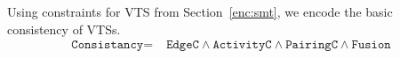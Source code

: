Using constraints for VTS from Section~\ref{enc:smt}, we encode the basic consistency of VTSs. 
%
\begin{align*}
\texttt{Consistancy} =\;& \texttt{EdgeC} \land
\texttt{ActivityC} \land \texttt{PairingC} \land
\texttt{Fusion} 
\end{align*}

